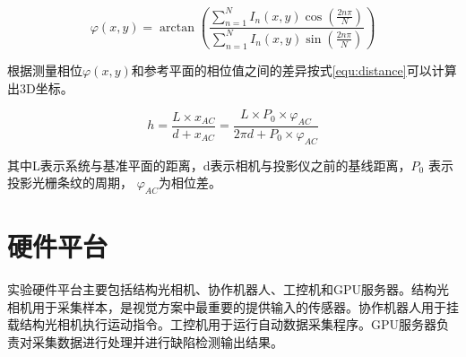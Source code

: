 \begin{equation}\label{equ:varphical}
  \varphi(x, y)=\arctan \left(\frac{\sum_{n=1}^{N} I_{n}(x, y) \cos \left(\frac{2 n \pi}{N}\right)}{\sum_{n=1}^{N} I_{n}(x, y) \sin \left(\frac{2 n \pi}{N}\right)}\right)
\end{equation}


根据测量相位$\varphi(x, y)$和参考平面的相位值之间的差异按式\ref{equ:distance}可以计算出3D坐标。

\begin{equation}\label{equ:distance}
  h=\frac{L \times x_{A C}}{d+x_{A C}}=\frac{L \times P_{0} \times \varphi_{A C}}{2 \pi d+P_{0} \times \varphi_{A C}}
\end{equation}


其中L表示系统与基准平面的距离，d表示相机与投影仪之前的基线距离，$P_{0}$ 表示投影光栅条纹的周期， $\varphi_{A C}$为相位差。




\section{硬件平台}

实验硬件平台主要包括结构光相机、协作机器人、工控机和GPU服务器。结构光相机用于采集样本，是视觉方案中最重要的提供输入的传感器。协作机器人用于挂载结构光相机执行运动指令。工控机用于运行自动数据采集程序。GPU服务器负责对采集数据进行处理并进行缺陷检测输出结果。

